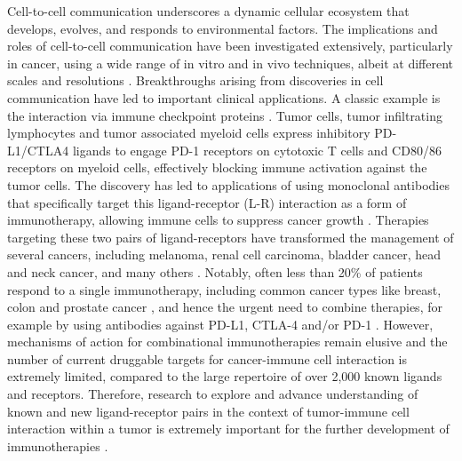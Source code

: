 Cell-to-cell communication underscores a dynamic cellular ecosystem that develops, evolves, and responds to environmental factors. The implications and roles of cell-to-cell communication have been investigated extensively, particularly in cancer, using a wide range of in vitro and in vivo techniques, albeit at different scales and resolutions \cite{brucher2014cell}. Breakthroughs arising from discoveries in cell communication have led to important clinical applications. A classic example is the interaction via immune checkpoint proteins \cite{pardoll2012blockade}. Tumor cells, tumor infiltrating lymphocytes and tumor associated myeloid cells express inhibitory PD-L1/CTLA4 ligands to engage PD-1 receptors on cytotoxic T cells and CD80/86 receptors on myeloid cells, effectively blocking immune activation against the tumor cells. The discovery has led to applications of using monoclonal antibodies that specifically target this ligand-receptor (L-R) interaction as a form of immunotherapy, allowing immune cells to suppress cancer growth \cite{weiner2012antibody}. Therapies targeting these two pairs of ligand-receptors have transformed the management of several cancers, including melanoma, renal cell carcinoma, bladder cancer, head and neck cancer, and many others \cite{ott2017combination}. Notably, often less than 20\% of patients respond to a single immunotherapy, including common cancer types like breast, colon and prostate cancer \cite{ott2017combination}, and hence the urgent need to combine therapies, for example by using antibodies against PD-L1, CTLA-4 and/or PD-1 \cite{ott2017combination}. However, mechanisms of action for combinational immunotherapies remain elusive \cite{wei2019combination} and the number of current druggable targets for cancer-immune cell interaction is extremely limited, compared to the large repertoire of over 2,000 known ligands and receptors. Therefore, research to explore and advance understanding of known and new ligand-receptor pairs in the context of tumor-immune cell interaction within a tumor is extremely important for the further development of immunotherapies \cite{weiner2012antibody, helmy2013cancer}. 

